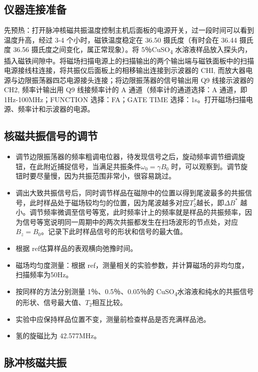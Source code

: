 \subsection{仪器连接准备}\label{ux4eeaux5668ux8fdeux63a5ux51c6ux5907}

先预热：打开脉冲核磁共振温度控制主机后面板的电源开关，过一段时间可以看到温度升高，经过
3-4 个小时，磁铁温度稳定在 36.50 摄氏度（有时会在 36.44 摄氏度 36.56
摄氏度之间变化，属正常现象）。将 5％CuSO\textsubscript{4}
水溶液样品放入探头内，插入磁铁间隙中。将磁场扫描电源上的扫描输出的两个输出端与磁铁面板中的扫描电源接线柱连接，将共振仪后面板上的相移输出连接到示波器的
CHI, 而放大器电源与边限振荡器四芯电源接头连接；将边限振荡器的信号输出用
Q9 线接示波器的 CH2, 频率计输出用 Q9 线接频率计的 A
通道（频率计的通道选择：A 通道，即 1Hz-100MHz；FUNCTION 选择：FA；GATE
TIME 选择：1s。打开磁场扫描电源、频率计和示波器的电源。

\subsection{核磁共振信号的调节}\label{ux6838ux78c1ux5171ux632fux4fe1ux53f7ux7684ux8c03ux8282}

\begin{itemize}
\item
  调节边限振荡器的频率粗调电位器，待发现信号之后，旋动频率调节细调旋钮，在此附近捕捉信号，当满足共振条件$\omega_0=\gamma B_0$
时，可以观察到。调节旋钮时要尽量慢，因为共振范围非常小，很容易跳过。
\item
  调出大致共振信号后，同时调节样品在磁隙中的位置以得到尾波最多的共振信号，此时样品处于磁场较均匀的位置，因为尾波越多对应$T_2^{*}$越长，即$\Delta B^{*}$  越小。调节频率微调至信号等宽，此时频率计上的频率就是样品的共振频率，因为信号等宽说明同一周期中的两次共振都发生在扫场波形的节点处，对应$B_z = B_0$。记录下此时样品信号的形状和信号的最大值。
\item
  根据{\color{red} ref}估算样品的表观横向弛豫时间。
\item
  磁场均匀度测量：根据{\color{red} ref}，测量相关的实验参数，并计算磁场的非均匀度，扫描频率为50Hz。
\item
  按同样的方法分别测量 1％、0.5％、0.05％的 CuSO\textsubscript{4}水溶液和纯水的共振信号的形状、信号最大值、$T_2$相互比较。
\item
  实验中应保持样品位置不变，测量前检查样品是否充满样品池。
\item
  氢的旋磁比为 42.577MHz。
\end{itemize}

\subsection{脉冲核磁共振}\label{ux8109ux51b2ux6838ux78c1ux5171ux632f}

